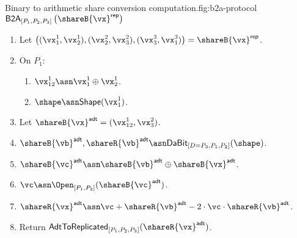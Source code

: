 \begin{Boxfig}{Binary to arithmetic share conversion computation.}{fig:b2a-protocol}
  {$\mathsf{B2A}_{[P_1, P_2, P_3]} \left( \shareB{\vx}^\mathsf{rep} \right)$}
  \begin{enumerate}
  \item Let $\left( (\vx_1^1, \vx_2^1), (\vx_2^2, \vx_3^2), (\vx_3^3, \vx_1^3) \right) = \shareB{\vx}^\mathsf{rep}$.
  \item On $P_1$:
  \begin{enumerate}
  \item $\vx^1_{12} \asn \vx_1^1 \oplus \vx_2^1$.
  \item $\shape \asn \mathsf{Shape}(\vx^1_1)$.
  \end{enumerate}
  \item Let $\shareB{\vx}^\mathsf{adt} = (\vx^1_{12}, \vx_3^2)$.
  \item $\shareB{\vb}^\mathsf{adt}, \shareR{\vb}^\mathsf{adt} \asn \textsf{DaBit}_{[D=P_3, P_1, P_2]}(\shape)$.
  \item $\shareB{\vc}^{\mathsf{adt}} \asn \shareB{\vb}^\mathsf{adt} \oplus \shareB{\vx}^{\mathsf{adt}}$.
  \item $\vc \asn \Open_{[P_1, P_2]}(\shareB{\vc}^{\mathsf{adt}})$.
  \item $\shareR{\vx}^\mathsf{adt} \asn \vc + \shareR{\vb}^{\mathsf{adt}} - 2 \cdot \vc \cdot \shareR{\vb}^{\mathsf{adt}}$.
  \item Return $\textsf{AdtToReplicated}_{[P_1,P_2,P_3]}(\shareR{\vx}^\mathsf{adt})$.
\end{enumerate}

\end{Boxfig}

